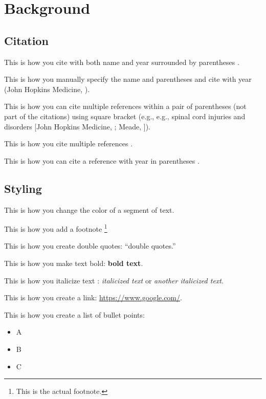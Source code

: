 \section{Background}

\subsection{Citation}
This is how you cite with both name and year surrounded by parentheses \parencite{anderson_chronic_2010}. 

This is how you manually specify the name and parentheses and cite with year (John Hopkins Medicine, \citeyear{john_hopkins_medicine_acute_2021}).

This is how you can cite multiple references within a pair of parentheses (not part of the citations) using square bracket (e.g., e.g., spinal cord injuries and disorders [John Hopkins Medicine, \citeyear{john_hopkins_medicine_acute_2021}; Meade, \citeyear{meade_health_2009}]).

This is how you cite multiple references \parencite{meade_health_2009, mamykina_mahi_2008,rooksby_personal_2014, murnane_personal_2018, raj_understanding_2017}.

This is how you can cite a reference with year in parentheses \textcite{anderson_patient_1995}.

\subsection{Styling}

\textcolor{\changecolor}{This is how you change the color of a segment of text.}

This is how you add a footnote \footnote{This is the actual footnote.}

This is how you create double quotes: ``double quotes.''

This is how you make text bold: \textbf{bold text}.


This is how you italicize text : \emph{italicized text} or \textit{another italicized text}.

This is how you create a link: \url{https://www.google.com/}.

This is how you create a list of bullet points:

\begin{itemize}
    \item A
    \item B
    \item C
\end{itemize}

